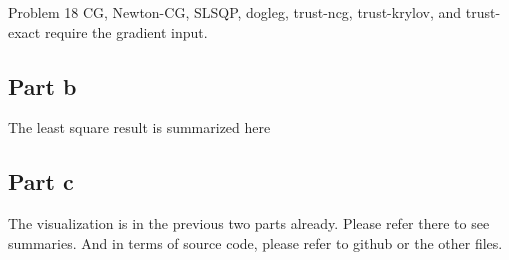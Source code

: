 \documentclass[12pt]{article}
\begin{document}
\begin{section}{Problem 18}
	CG, Newton-CG, SLSQP, dogleg, trust-ncg, trust-krylov, and trust-exact require the gradient input. 
	\subsection{Part b}
	The least square result is summarized here 
	
	\subsection{Part c}
	The visualization is in the previous two parts already. Please refer there to see summaries. And in terms of source code, please refer to github or the other files. 
\end{section}
\end{document}
